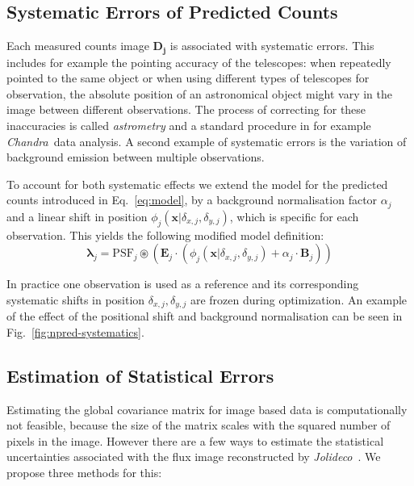 \documentclass[twocolumn]{aastex631}
\newcommand{\chandra}{\textit{Chandra}~}
\newcommand{\jolideco}{\textit{Jolideco}~}
\begin{document}
    \subsection{Systematic Errors of Predicted Counts}
    Each measured counts image $\mathbf{D_j}$ is associated with systematic errors. This includes for example the pointing accuracy of the telescopes: when repeatedly pointed to the same object or when using different types of telescopes for observation, the absolute position of an astronomical object might vary in the image between different observations. The process of correcting for these inaccuracies is called \textit{astrometry} and a standard procedure in for example \chandra data analysis. A second example of systematic errors is the variation of background emission between multiple observations.
    
    To account for both systematic effects we extend the model for the predicted counts introduced in Eq.~\ref{eq:model}, by a background normalisation factor $\alpha_j$ and a linear shift in position $\phi_j(\mathbf{x}| \delta_{x,j}, \delta_{y,j})$, which is specific for each observation. This yields the following modified model definition:
    \begin{equation}
        \label{eq:model-npred-calibration}
        \mathbf{\lambda}_j = \mathrm{PSF}_j \circledast \left(\mathbf{E}_j \cdot (\phi_j(\mathbf{x}| \delta_{x,j}, \delta_{y,j}) + \alpha_j \cdot \mathbf{B}_j) \right)
    \end{equation}
    
    In practice one observation is used as a reference and its corresponding systematic shifts in position $\delta_{x,j}, \delta_{y,j}$ are frozen during optimization. An example of the effect of the positional shift and background normalisation can be seen in Fig.~\ref{fig:npred-systematics}.

    \subsection{Estimation of Statistical Errors}
    Estimating the global covariance matrix for image based data is computationally not feasible, because the size of the matrix scales with the squared number of pixels in the image. However there are a few ways to estimate the statistical uncertainties associated with the flux image reconstructed by \jolideco. We propose three methods for this:
\end{document}
